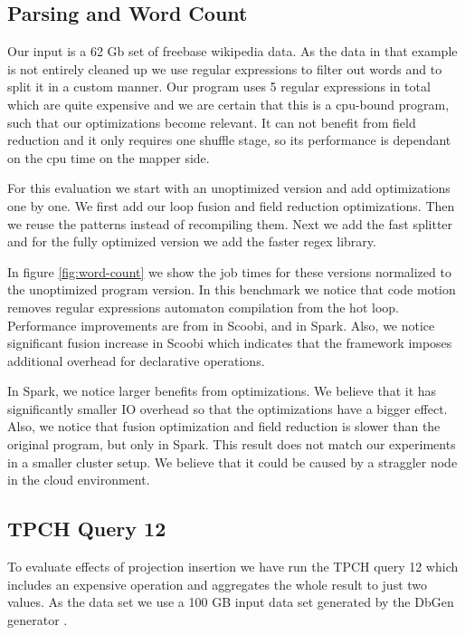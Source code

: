 \subsection{Parsing and Word Count}
\label{subsec:parsing-word-count}
Our input is a 62 Gb set of freebase wikipedia data. As the data in that example is not entirely cleaned up we use regular expressions to filter out words and to split it in a custom manner. Our program uses 5 regular expressions in total which are quite expensive and we are certain that this is a cpu-bound program, such that our optimizations become relevant.
It can not benefit from field reduction and it only requires one shuffle stage, so its performance is dependant on the cpu time on the mapper side. 

For this evaluation we start with an unoptimized version and add optimizations one by one. We first add our loop fusion and field reduction optimizations. Then we reuse the patterns instead of recompiling them. Next we add the fast splitter and for the fully optimized version we add the faster regex library. 

In figure \ref{fig:word-count} we show the job times for these versions normalized to the unoptimized program version. In this benchmark we notice that code motion removes regular expressions automaton compilation from the hot loop. Performance improvements are from  in Scoobi,  and in Spark. Also, we notice significant fusion increase in Scoobi which indicates that the framework imposes additional overhead for declarative operations. 

In Spark, we notice larger benefits from optimizations. We believe that it has significantly smaller IO overhead so that the optimizations have a bigger effect. Also, we notice that fusion optimization and field reduction is slower than the original program, but only in Spark. This result does not match our experiments in a smaller cluster setup. We believe that it could be caused by a straggler node in the cloud environment.

\subsection{TPCH Query 12}
\label{subsec:tpch-query-12}

To evaluate effects of projection insertion we have run the TPCH query 12 which includes an expensive  operation and aggregates the whole result to just two values. As the data set we use a 100 GB input data set generated by the DbGen generator \cite{_dbgen_????}.

